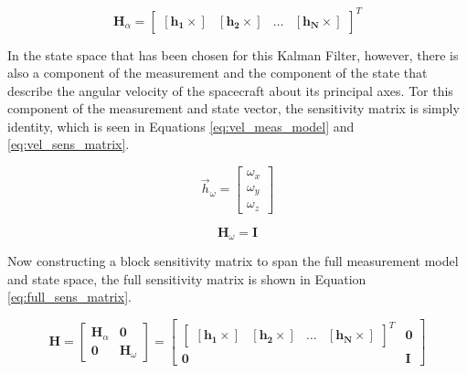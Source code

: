 \begin{equation} \label{eq:attitude_sens_matrix}
    \boldsymbol{H}_{\alpha} = \begin{bmatrix}
        \boldsymbol{ \left[ h_1 \times \right] } & \boldsymbol{ \left[ h_2 \times \right] } & \dots & \boldsymbol{ \left[ h_N \times \right] }
    \end{bmatrix}^T
\end{equation}

In the state space that has been chosen for this Kalman Filter, however, there is also a component of the measurement and the component of the state that describe the angular velocity of the spacecraft about its principal axes. Tor this component of the measurement and state vector, the sensitivity matrix is simply identity, which is seen in Equations \ref{eq:vel_meas_model} and \ref{eq:vel_sens_matrix}.

\begin{equation} \label{eq:vel_meas_model}
    \vec{h}_{\omega} = \begin{bmatrix}
        \omega_x \\
        \omega_y \\
        \omega_z
    \end{bmatrix}
\end{equation}

\begin{equation} \label{eq:vel_sens_matrix}
    \boldsymbol{H}_{\omega} = \boldsymbol{I}
\end{equation}

Now constructing a block sensitivity matrix to span the full measurement model and state space, the full sensitivity matrix is shown in Equation \ref{eq:full_sens_matrix}.

\begin{equation} \label{eq:full_sens_matrix}
    \boldsymbol{H} = \begin{bmatrix}
        \boldsymbol{H}_{\alpha} & \boldsymbol{0} \\
        \boldsymbol{0} & \boldsymbol{H}_{\omega}
    \end{bmatrix} = \begin{bmatrix}
        \begin{bmatrix}
        \boldsymbol{ \left[ h_1 \times \right] } & \boldsymbol{ \left[ h_2 \times \right] } & \dots & \boldsymbol{ \left[ h_N \times \right] }
    \end{bmatrix}^T & \boldsymbol{0} \\
        \boldsymbol{0} & \boldsymbol{I}
    \end{bmatrix}
\end{equation}

